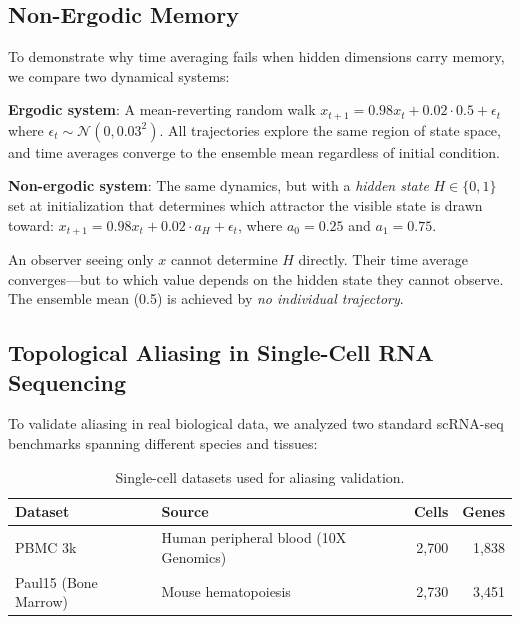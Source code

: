\documentclass[12pt]{article}
\begin{document}
\subsection{Non-Ergodic Memory}

To demonstrate why time averaging fails when hidden dimensions carry memory, we compare two dynamical systems:

\textbf{Ergodic system}: A mean-reverting random walk $x_{t+1} = 0.98 x_t + 0.02 \cdot 0.5 + \epsilon_t$ where $\epsilon_t \sim \mathcal{N}(0, 0.03^2)$. All trajectories explore the same region of state space, and time averages converge to the ensemble mean regardless of initial condition.

\textbf{Non-ergodic system}: The same dynamics, but with a \emph{hidden state} $H \in \{0, 1\}$ set at initialization that determines which attractor the visible state is drawn toward: $x_{t+1} = 0.98 x_t + 0.02 \cdot a_H + \epsilon_t$, where $a_0 = 0.25$ and $a_1 = 0.75$.

An observer seeing only $x$ cannot determine $H$ directly. Their time average converges---but to which value depends on the hidden state they cannot observe. The ensemble mean (0.5) is achieved by \emph{no individual trajectory}.

\subsection{Topological Aliasing in Single-Cell RNA Sequencing}

To validate aliasing in real biological data, we analyzed two standard scRNA-seq benchmarks spanning different species and tissues:

\begin{table}[h]
\centering
\begin{tabular}{@{}llrr@{}}
\toprule
\textbf{Dataset} & \textbf{Source} & \textbf{Cells} & \textbf{Genes} \\
\midrule
PBMC 3k & Human peripheral blood (10X Genomics) & 2,700 & 1,838 \\
Paul15 (Bone Marrow) & Mouse hematopoiesis & 2,730 & 3,451 \\
\bottomrule
\end{tabular}
\caption{Single-cell datasets used for aliasing validation.}
\label{tab:datasets}
\end{table}
\end{document}
